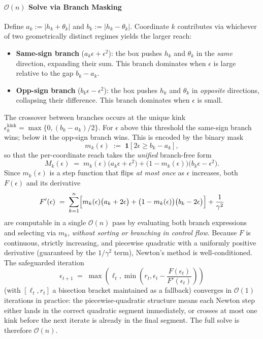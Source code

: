 \documentclass{article}
\theoremstyle{plain}
\theoremstyle{definition}
\theoremstyle{remark}
\begin{document}
\paragraph{$\mathcal{O}(n)$ Solve via Branch Masking}
Define $a_k := |h_k+\theta_{k}|$ and $b_k := |h_k-\theta_{k}|$.
Coordinate $k$ contributes via whichever of two geometrically distinct regimes yields the larger reach:
\begin{itemize}
  \item \textbf{Same-sign branch} ($a_k\epsilon + \epsilon^2$): the box pushes
        $h_k$ and $\theta_{k}$ in the \emph{same} direction, expanding their sum.
        This branch dominates when $\epsilon$ is large relative to the gap
        $b_k - a_k$.
  \item \textbf{Opp-sign branch} ($b_k\epsilon - \epsilon^2$): the box pushes
        $h_k$ and $\theta_{k}$ in \emph{opposite} directions, collapsing their
        difference. This branch dominates when $\epsilon$ is small.
\end{itemize}
The crossover between branches occurs at the unique kink
$\epsilon_k^{\mathrm{kink}} = \max\{0, (b_k - a_k)/2\}$.
For $\epsilon$ above this threshold the same-sign branch wins; below it the
opp-sign branch wins. This is encoded by the binary mask
\[
  m_k(\epsilon) \;:=\; \mathbf{1}\!\left[2\epsilon \geq b_k - a_k\right],
\]
so that the per-coordinate reach takes the \emph{unified} branch-free form
\begin{equation}
  M_k(\epsilon)
    \;=\; m_k(\epsilon)\bigl(a_k\epsilon+\epsilon^2\bigr)
      + \bigl(1-m_k(\epsilon)\bigr)\bigl(b_k\epsilon-\epsilon^2\bigr).
\end{equation}
Since $m_k(\epsilon)$ is a step function that flips \emph{at most once} as
$\epsilon$ increases, both $F(\epsilon)$ and its derivative
\begin{equation}
  F'(\epsilon)
    \;=\; \sum_{k=1}^{n}\Bigl[
        m_k(\epsilon)\bigl(a_k + 2\epsilon\bigr)
      + \bigl(1-m_k(\epsilon)\bigr)\bigl(b_k - 2\epsilon\bigr)
    \Bigr] + \frac{1}{\gamma^2}
\end{equation}
are computable in a single $\mathcal{O}(n)$ pass by evaluating both branch
expressions and selecting via $m_k$, \emph{without sorting or branching in
control flow}. Because $F$ is continuous, strictly increasing, and piecewise
quadratic with a uniformly positive derivative (guaranteed by the
$1/\gamma^2$ term), Newton's method is well-conditioned. The safeguarded
iteration
\[
  \epsilon_{t+1}
    \;=\; \max\!\left(\ell_t,\min\!\left(r_t, \epsilon_t - \frac{F(\epsilon_t)}{F'(\epsilon_t)}\right)\right)
\]
(with $[\ell_t, r_t]$ a bisection bracket maintained as a fallback) converges
in $\mathcal{O}(1)$ iterations in practice: the piecewise-quadratic structure means each Newton step either lands in the correct quadratic segment immediately, or crosses at most one kink before the next iterate is already in the final segment. The full solve is therefore $\mathcal{O}(n)$.
\end{document}
